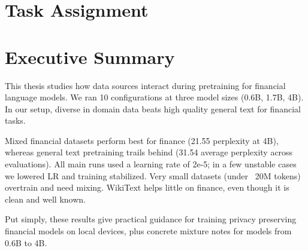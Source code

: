 \documentclass[11pt,a4paper,english,oneside]{book}
\begin{document}
\thispagestyle{empty}
\titleGP

\newpage

\setcounter{page}{1}

\section*{Task Assignment}
\thispagestyle{firststyle}
\newpage

\section*{Executive Summary}
\thispagestyle{firststyle}

This thesis studies how data sources interact during pretraining for financial language models. We ran 10 configurations at three model sizes (0.6B, 1.7B, 4B). In our setup, diverse in domain data beats high quality general text for financial tasks.

Mixed financial datasets perform best for finance (21.55 perplexity at 4B), whereas general text pretraining trails behind (31.54 average perplexity across evaluations). All main runs used a learning rate of 2e-5; in a few unstable cases we lowered LR and training stabilized. Very small datasets (under ~20M tokens) overtrain and need mixing. WikiText helps little on finance, even though it is clean and well known.

Put simply, these results give practical guidance for training privacy preserving financial models on local devices, plus concrete mixture notes for models from 0.6B to 4B.

\newpage

\tableofcontents
\listoffigures
\listoftables
\end{document}
